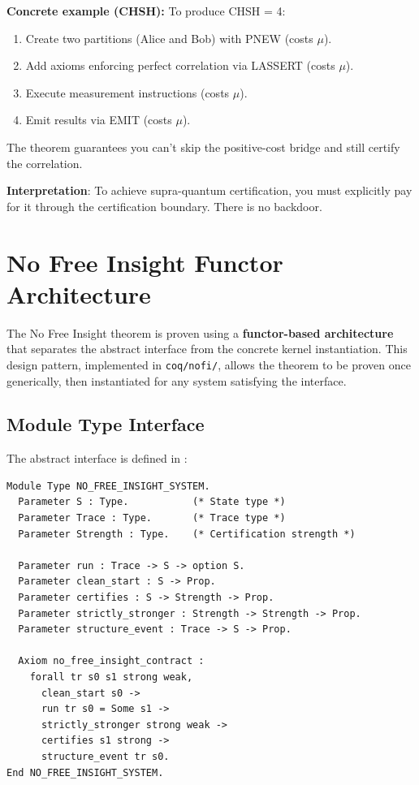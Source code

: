 \textbf{Concrete example (CHSH):} To produce CHSH = 4:
\begin{enumerate}
    \item Create two partitions (Alice and Bob) with PNEW (costs $\mu$).
    \item Add axioms enforcing perfect correlation via LASSERT (costs $\mu$).
    \item Execute measurement instructions (costs $\mu$).
    \item Emit results via EMIT (costs $\mu$).
\end{enumerate}
The theorem guarantees you can't skip the positive-cost bridge and still certify the correlation.

\textbf{Interpretation}: To achieve supra-quantum certification, you must explicitly pay for it through the certification boundary. There is no backdoor.


\section{No Free Insight Functor Architecture}

The No Free Insight theorem is proven using a \textbf{functor-based architecture} that separates the abstract interface from the concrete kernel instantiation. This design pattern, implemented in \texttt{coq/nofi/}, allows the theorem to be proven once generically, then instantiated for any system satisfying the interface.

\subsection{Module Type Interface}

The abstract interface is defined in :
\begin{lstlisting}
Module Type NO_FREE_INSIGHT_SYSTEM.
  Parameter S : Type.           (* State type *)
  Parameter Trace : Type.       (* Trace type *)
  Parameter Strength : Type.    (* Certification strength *)
  
  Parameter run : Trace -> S -> option S.
  Parameter clean_start : S -> Prop.
  Parameter certifies : S -> Strength -> Prop.
  Parameter strictly_stronger : Strength -> Strength -> Prop.
  Parameter structure_event : Trace -> S -> Prop.
  
  Axiom no_free_insight_contract :
    forall tr s0 s1 strong weak,
      clean_start s0 ->
      run tr s0 = Some s1 ->
      strictly_stronger strong weak ->
      certifies s1 strong ->
      structure_event tr s0.
End NO_FREE_INSIGHT_SYSTEM.
\end{lstlisting}

